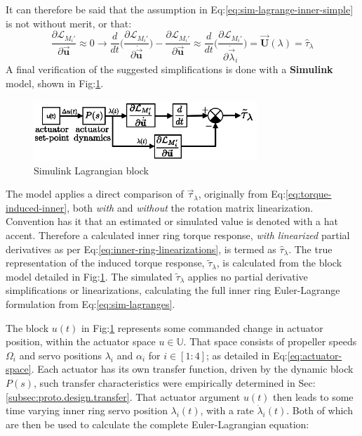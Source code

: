 It can therefore be said that the assumption in Eq:\ref{eq:sim-lagrange-inner-simple} is not without merit, or that:
\begin{equation}
\frac{\partial\mathcal{L}_{M_i'}}{\partial\vec{\mathbf{u}}}\approx 0\rightarrow\frac{d}{dt}\bigg(\frac{\partial\mathcal{L}_{M_i'}}{\partial\dot{\vec{\mathbf{u}}}}\bigg)-\frac{\partial\mathcal{L}_{M_i'}}{\partial\vec{\mathbf{u}}}\approx\frac{d}{dt}\Big(\frac{\partial\mathcal{L}_{M_i'}}{\partial\dot{\vec{\lambda}}_i}\Big)=\vec{\mathbf{U}}(\lambda)=\hat{\tau}_\lambda
\end{equation}
A final verification of the suggested simplifications is done with a \textbf{Simulink} model, shown in Fig:\ref{fig:linear-block}.
\par
\begin{figure}[htbp]
\vspace{-4pt}
\centering
\includegraphics[width=0.75\textwidth]{figs/linear-block}
\caption{Simulink Lagrangian block}
\label{fig:linear-block}
\end{figure}
\par
 The model applies a direct comparison of $\vec{\tau}_\lambda$, originally from Eq:\ref{eq:torque-induced-inner}, both \emph{with} and \emph{without} the rotation matrix linearization. Convention has it that an estimated or simulated value is denoted with a hat accent. Therefore a calculated inner ring torque response, \emph{with linearized} partial derivatives as per Eq:\ref{eq:inner-ring-linearizations}, is termed as $\hat{\tau}_\lambda$. The true representation of the induced torque response, $\widetilde{\tau}_\lambda$, is calculated from the block model detailed in Fig:\ref{fig:linear-block}. The simulated $\widetilde{\tau}_\lambda$ applies no partial derivative simplifications or linearizations, calculating the full inner ring Euler-Lagrange formulation from Eq:\ref{eq:sim-lagranges}.
\par
The block $u(t)$ in Fig:\ref{fig:linear-block} represents some commanded change in actuator position, within the actuator space $u\in\mathbb{U}$. That space consists of propeller speeds $\Omega_i$ and servo positions $\lambda_i$ and $\alpha_i$ for $i\in[1:4]$; as detailed in Eq:\ref{eq:actuator-space}. Each actuator has its own transfer function, driven by the dynamic block $P(s)$, such transfer characteristics were empirically determined in Sec:\ref{subsec:proto.design.transfer}. That actuator argument $u(t)$ then leads to some time varying inner ring servo position $\lambda_i(t)$, with a rate $\dot{\lambda}_i(t)$. Both of which are then be used to calculate the complete Euler-Lagrangian equation:
